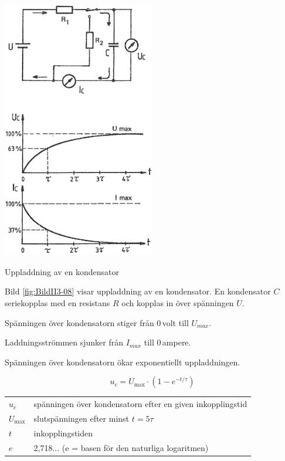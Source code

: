 \begin{marginfigure}%
  \includegraphics[width=0.5\textwidth]{images/cropped_pdfs/bild_2_3-08.pdf}
  \caption{Uppladdning av en kondensator}
  \label{fig:BildII3-08}
\end{marginfigure}

Bild \ref{fig:BildII3-08} visar uppladdning av en kondensator.
En kondensator \(C\) seriekopplas med en resistans \(R\)
och kopplas in över spänningen \(U\).

Spänningen över kondensatorn stiger från 0\,volt till \(U_{max}\).

Laddningsströmmen sjunker från \(I_{max}\) till 0\,ampere.

Spänningen över kondensatorn ökar exponentiellt uppladdningen.

\[ u_c = U_{\text{max}} \cdot \left( 1 - e^{-t/\tau} \right) \]

\begin{tabular}{lp{\textwidth}}
  \(u_c\)         & spänningen över kondensatorn efter en given inkopplingstid \\
  \(U_{\text{max}}\) & slutspänningen efter minst \(t = 5\tau\) \\
  \(t\)           & inkopplingstiden \\
  \(e\)           & 2,718... (e = basen för den naturliga logaritmen) \\
\end{tabular}\\[\baselineskip]

